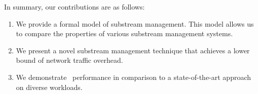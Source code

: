 In summary, our contributions are as follows:
\begin{enumerate}
    \item We provide a formal model of substream management. This model allows us to compare the properties of various substream management systems.
    \item We present a novel substream management technique that achieves a lower bound of network traffic overhead.
    \item We demonstrate \tracker\ performance in comparison to a state-of-the-art approach on diverse workloads.
\end{enumerate}


